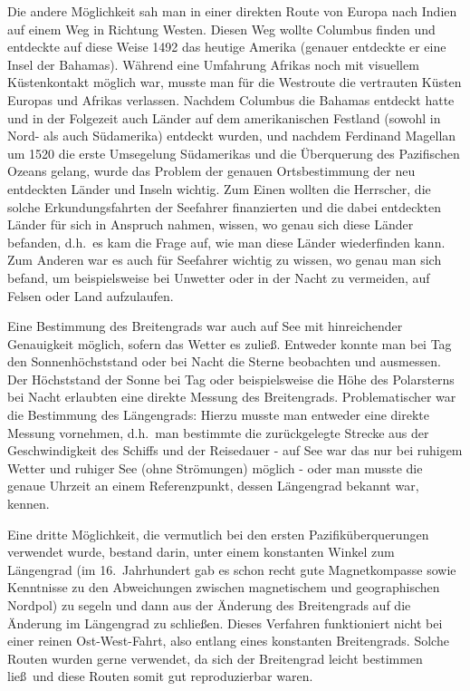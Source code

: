 Die andere M\"oglichkeit sah man in einer direkten Route von Europa nach Indien auf einem Weg
in Richtung Westen. 
Diesen Weg wollte Columbus finden und entdeckte auf diese Weise
1492 das heutige Amerika (genauer entdeckte er eine Insel der Bahamas). W\"ahrend eine Umfahrung Afrikas
noch mit visuellem K\"ustenkontakt m\"oglich war, musste man f\"ur die Westroute die
vertrauten K\"usten Europas und Afrikas verlassen. Nachdem Columbus die Bahamas entdeckt hatte 
und in der Folgezeit auch L\"ander auf dem amerikanischen Festland
(sowohl in Nord- als auch S\"udamerika) entdeckt wurden, und nachdem 
Ferdinand Magellan 
um 1520 die erste Umsegelung S\"udamerikas und die \"Uberquerung des Pazifischen Ozeans
gelang, wurde das Problem der genauen Ortsbestimmung der neu entdeckten L\"ander und
Inseln wichtig. Zum Einen wollten die Herrscher, die solche Erkundungsfahrten der Seefahrer
finanzierten und die dabei entdeckten L\"ander f\"ur sich in Anspruch nahmen, wissen, wo 
genau sich diese L\"ander befanden, d.h.\ es kam die Frage auf, wie man diese L\"ander wiederfinden kann. 
Zum Anderen war es auch f\"ur Seefahrer wichtig zu wissen, wo genau man sich
befand, um beispielsweise bei Unwetter oder in der Nacht zu vermeiden, auf Felsen oder
Land aufzulaufen. 

Eine Bestimmung des Breitengrads 
war auch auf See mit hinreichender Genauigkeit
m\"oglich, sofern das Wetter es zulie\ss. Entweder konnte man bei Tag den Sonnenh\"ochststand oder
bei Nacht die Sterne beobachten und ausmessen. Der H\"ochststand der Sonne bei
Tag oder beispielsweise die H\"ohe des Polarsterns bei Nacht erlaubten eine direkte
Messung des Breitengrads. Problematischer war die Bestimmung des 
L\"angengrads:
Hierzu musste man entweder eine direkte Messung vornehmen, d.h.\ man bestimmte die zur\"uckgelegte
Strecke aus der Geschwindigkeit des Schiffs und der Reisedauer  -  auf See war das nur
bei ruhigem Wetter und ruhiger See (ohne Str\"omungen) m\"oglich - oder man musste 
die genaue Uhrzeit an einem Referenzpunkt, dessen L\"angengrad bekannt war, kennen.
 
Eine dritte M\"oglichkeit, die vermutlich bei den ersten Pazifik\"uberquerungen verwendet wurde,
bestand darin, unter einem konstanten Winkel zum L\"angengrad (im 16.\ Jahrhundert gab es
schon recht gute Magnetkompasse sowie Kenntnisse zu den Abweichungen zwischen
magnetischem und geographischen Nordpol) zu segeln und dann aus der \"Anderung des
Breitengrads auf die \"Anderung im L\"angengrad zu schlie\ss en. Dieses Verfahren funktioniert
nicht bei einer reinen Ost-West-Fahrt, also entlang eines konstanten Breitengrads. Solche Routen
wurden gerne verwendet, da sich der Breitengrad leicht bestimmen lie\ss\ und diese
Routen somit gut reproduzierbar waren.


